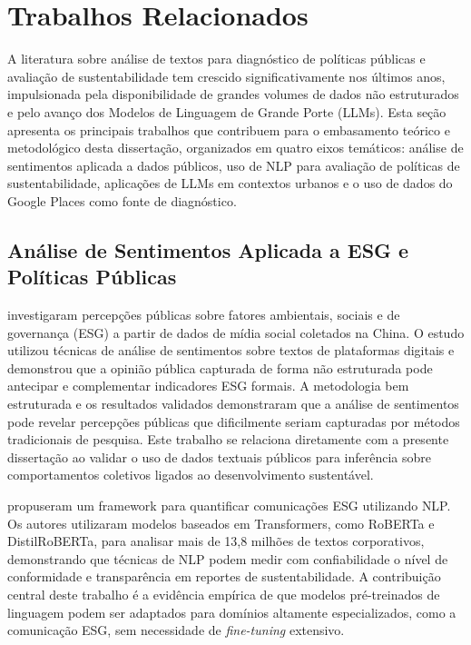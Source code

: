 \chapter{Trabalhos Relacionados}
\label{cap:trabalhos-relacionados}

A literatura sobre análise de textos para diagnóstico de políticas públicas e avaliação de sustentabilidade tem crescido significativamente nos últimos anos, impulsionada pela disponibilidade de grandes volumes de dados não estruturados e pelo avanço dos Modelos de Linguagem de Grande Porte (\gls{LLM}s). Esta seção apresenta os principais trabalhos que contribuem para o embasamento teórico e metodológico desta dissertação, organizados em quatro eixos temáticos: análise de sentimentos aplicada a dados públicos, uso de \gls{NLP} para avaliação de políticas de sustentabilidade, aplicações de LLMs em contextos urbanos e o uso de dados do Google Places como fonte de diagnóstico.

\section{Análise de Sentimentos Aplicada a ESG e Políticas Públicas}
\label{sec:tr-esg}

\citeauthor{liu2023esg} \citeyear{liu2023esg} investigaram percepções públicas sobre fatores ambientais, sociais e de governança (\gls{ESG}) a partir de dados de mídia social coletados na China. O estudo utilizou técnicas de análise de sentimentos sobre textos de plataformas digitais e demonstrou que a opinião pública capturada de forma não estruturada pode antecipar e complementar indicadores ESG formais. A metodologia bem estruturada e os resultados validados demonstraram que a análise de sentimentos pode revelar percepções públicas que dificilmente seriam capturadas por métodos tradicionais de pesquisa. Este trabalho se relaciona diretamente com a presente dissertação ao validar o uso de dados textuais públicos para inferência sobre comportamentos coletivos ligados ao desenvolvimento sustentável.

\citeauthor{schimanski2024} \citeyear{schimanski2024} propuseram um framework para quantificar comunicações ESG utilizando \gls{NLP}. Os autores utilizaram modelos baseados em Transformers, como \gls{RoBERTa} e DistilRoBERTa, para analisar mais de 13,8 milhões de textos corporativos, demonstrando que técnicas de NLP podem medir com confiabilidade o nível de conformidade e transparência em reportes de sustentabilidade. A contribuição central deste trabalho é a evidência empírica de que modelos pré-treinados de linguagem podem ser adaptados para domínios altamente especializados, como a comunicação ESG, sem necessidade de \textit{fine-tuning} extensivo.

